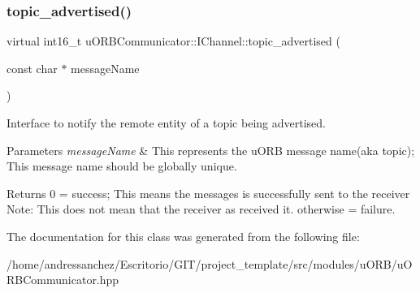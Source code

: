 \subsubsection{\texorpdfstring{topic\+\_\+advertised()}{topic\_advertised()}}
{\footnotesize\ttfamily virtual int16\+\_\+t u\+O\+R\+B\+Communicator\+::\+I\+Channel\+::topic\+\_\+advertised (\begin{DoxyParamCaption}\item[{const char $\ast$}]{message\+Name }\end{DoxyParamCaption})\hspace{0.3cm}{\ttfamily [pure virtual]}}



Interface to notify the remote entity of a topic being advertised. 


\begin{DoxyParams}{Parameters}
{\em message\+Name} & This represents the u\+O\+RB message name(aka topic); This message name should be globally unique. \\
\hline
\end{DoxyParams}
\begin{DoxyReturn}{Returns}
0 = success; This means the messages is successfully sent to the receiver Note\+: This does not mean that the receiver as received it. otherwise = failure. 
\end{DoxyReturn}


The documentation for this class was generated from the following file\+:\begin{DoxyCompactItemize}
\item 
/home/andressanchez/\+Escritorio/\+G\+I\+T/project\+\_\+template/src/modules/u\+O\+R\+B/u\+O\+R\+B\+Communicator.\+hpp\end{DoxyCompactItemize}
